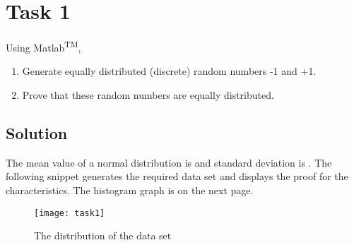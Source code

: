 \section*{Task 1}
Using Matlab\textsuperscript{TM},
\begin{enumerate}
    \item Generate equally distributed (discrete) random numbers -1 and +1.
    \item Prove that these random numbers are equally distributed.
\end{enumerate}

\subsection*{Solution}
The mean value of a normal distribution is  and standard deviation is . The following snippet generates the required data set and displays the proof for the characteristics. The histogram graph is on the next page.

\begin{figure}[H]
    \centering
    \texttt{[image: task1]}
    \caption{The distribution of the data set}
\end{figure}